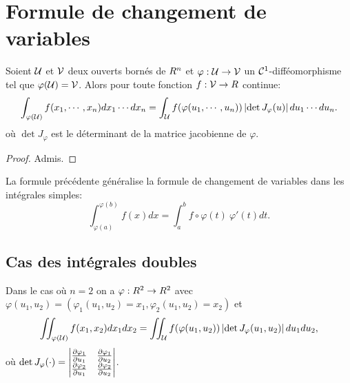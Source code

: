 \section{Formule de changement de variables}

\begin{proposition}
	Soient $\mathcal{U}$ et $\mathcal{V}$ deux ouverts bornés de $R^n$  et $\varphi: \mathcal{U} \to \mathcal{V}$ un $\mathcal{C}^1$-difféomorphisme tel que $\varphi(\mathcal{U}) = \mathcal{V}$. Alors pour toute fonction $f:\mathcal{V} \to R$ continue:
	\[
		\int_{\varphi(\mathcal{U}) } f(x_1,\cdots,x_n) dx_1\cdots dx_n = \int_{\mathcal{U}} f(\varphi(u_1,\cdots,u_n)) \left\lvert\det J_{\varphi}(u)\right\rvert du_1\cdots du_n.
	\]
où $\det J_\varphi$ est le déterminant de la matrice jacobienne de $\varphi$.
\end{proposition}
\begin{proof}
	Admis.
\end{proof}

La formule précédente généralise la formule de changement de variables dans les intégrales simples:
\[
	\int_{\varphi(a)}^{\varphi(b)} f(x) dx = \int_a^b f \circ \varphi (t)\   \varphi'(t) dt. 
\]
\sld{\vfill\pagebreak[5]}%

\subsection{Cas des intégrales doubles}

Dans le cas où $n=2$ on a $\varphi: R^2 \to R^2$ avec $ \varphi(u_1,u_2 ) = (\varphi_1(u_1,u_2 ) = x_1,\varphi_2 (u_1,u_2 )= x_2) $  et 
\[
	\iint_{\varphi(\mathcal{U})} f(x_1,x_2) dx_1dx_2  = \iint_{ \mathcal{U} } f( \varphi(u_1,u_2)) \left\lvert\det J_\varphi(u_1,u_2)\right\rvert du_1du_2,
\]
où $\det J_\varphi(\cdot) = \begin{vmatrix}
	\frac{\partial \varphi_1}{\partial u_1} & \frac{\partial \varphi_1}{\partial u_2}\\ \frac{\partial \varphi_2}{\partial u_1} & \frac{\partial \varphi_2}{\partial u_2} 
\end{vmatrix}$.


